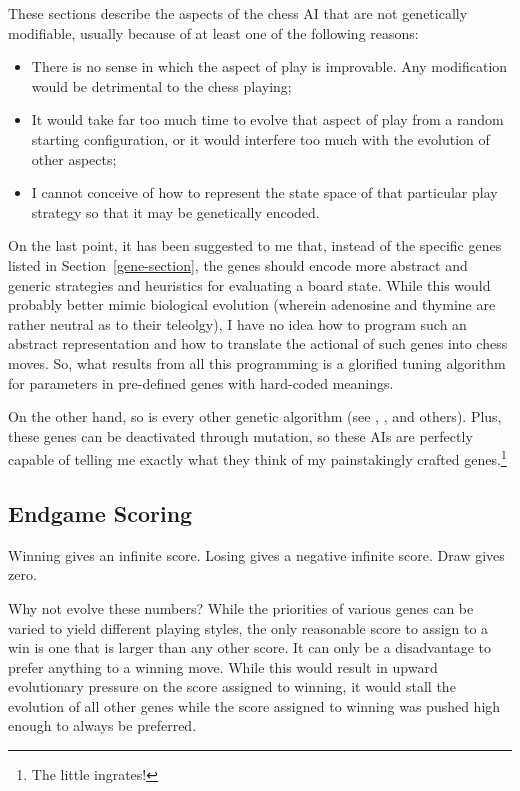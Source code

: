 \documentclass[letter]{article}
\renewcommand\_{\textunderscore\allowbreak}
\begin{document}
These sections describe the aspects of the chess AI that are not genetically modifiable, usually because of at least one of the following reasons:
\begin{itemize}
	\item There is no sense in which the aspect of play is improvable. Any modification would be detrimental to the chess playing;
	\item It would take far too much time to evolve that aspect of play from a random starting configuration, or it would interfere too much with the evolution of other aspects;
	\item I cannot conceive of how to represent the state space of that particular play strategy so that it may be genetically encoded.
\end{itemize}
On the last point, it has been suggested to me that, instead of the specific genes listed in Section~\ref{gene-section}, the genes should encode more abstract and generic strategies and heuristics for evaluating a board state. While this would probably better mimic biological evolution (wherein adenosine and thymine are rather neutral as to their teleolgy), I have no idea how to program such an abstract representation and how to translate the actional of such genes into chess moves. So, what results from all this programming is a glorified tuning algorithm for parameters in pre-defined genes with hard-coded meanings.

On the other hand, so is every other genetic algorithm (see \cite{evolved-antenna}, \cite{evolved-stellarator}, and others). Plus, these genes can be deactivated through mutation, so these AIs are perfectly capable of telling me exactly what they think of my painstakingly crafted genes.\footnote{The little ingrates!}

\subsection{Endgame Scoring}

Winning gives an infinite score.
Losing gives a negative infinite score.
Draw gives zero.

Why not evolve these numbers? While the priorities of various genes can be varied to yield different playing styles, the only reasonable score to assign to a win is one that is larger than any other score. It can only be a disadvantage to prefer anything to a winning move. While this would result in upward evolutionary pressure on the score assigned to winning, it would stall the evolution of all other genes while the score assigned to winning was pushed high enough to always be preferred.
\end{document}
